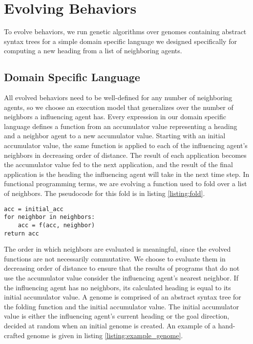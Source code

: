 \section{Evolving Behaviors}
To evolve behaviors, we run genetic algorithms over genomes containing
abstract syntax trees for a simple domain specific language we designed
specifically for computing a new heading from a list of neighboring agents.

\subsection{Domain Specific Language}
All evolved behaviors need to be well-defined for any number of
neighboring agents, so we choose an execution model that generalizes over the
number of neighbors a influencing agent has.
Every expression in our domain specific language defines a function from an
accumulator value representing a heading and a neighbor agent to a new
accumulator value.
Starting with an initial accumulator value, the same function is applied to
each of the influencing agent's neighbors in decreasing order of distance.
The result of each application becomes the accumulator value fed to the next
application, and the result of the final application is the heading the
influencing agent will take in the next time step.
In functional programming terms, we are evolving a function used to fold over a
list of neighbors.
The pseudocode for this fold is in listing \ref{listing:fold}.

\begin{lstlisting}[caption={A fold},captionpos=b,label={listing:fold}]
acc = initial_acc
for neighbor in neighbors:
    acc = f(acc, neighbor)
return acc
\end{lstlisting}

The order in which neighbors are evaluated is meaningful, since the evolved
functions are not necessarily commutative.
We choose to evaluate them in decreasing order of distance to ensure that the
results of programs that do not use the accumulator value consider the
influencing agent's nearest neighbor.
If the influencing agent has no neighbors, its calculated heading is equal to
its initial accumulator value.
A genome is comprised of an abstract syntax tree for the folding function and
the initial accumulator value.
The initial accumulator value is either the influencing agent's current heading
or the goal direction, decided at random when an initial genome is created.
An example of a hand-crafted genome is given in listing
\ref{listing:example_genome}.

